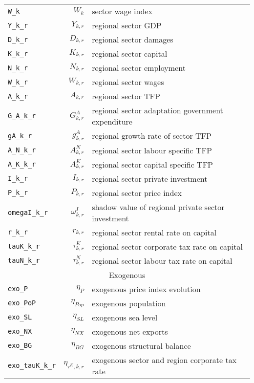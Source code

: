 \begin{center}
\begin{longtable}{lrl}
\texttt{W\_k} & ${W_k}$ & sector wage index\\
\texttt{Y\_k\_r} & ${Y_{k,r}}$ & regional sector GDP\\
\texttt{D\_k\_r} & ${D_{k,r}}$ & regional sector damages\\
\texttt{K\_k\_r} & ${K_{k,r}}$ & regional sector capital\\
\texttt{N\_k\_r} & ${N_{k,r}}$ & regional sector employment\\
\texttt{W\_k\_r} & ${W_{k,r}}$ & regional sector wages\\
\texttt{A\_k\_r} & ${A_{k,r}}$ & regional sector TFP\\
\texttt{G\_A\_k\_r} & ${G^{A}_{k,r}}$ & regional sector adaptation government expenditure\\
\texttt{gA\_k\_r} & ${g^{A}_{k,r}}$ & regional growth rate of sector TFP\\
\texttt{A\_N\_k\_r} & ${A^{N}_{k,r}}$ & regional sector labour specific TFP\\
\texttt{A\_K\_k\_r} & ${A^{K}_{k,r}}$ & regional sector capital specific TFP\\
\texttt{I\_k\_r} & ${I_{k,r}}$ & regional sector private investment\\
\texttt{P\_k\_r} & ${P_{k,r}}$ & regional sector price index\\
\texttt{omegaI\_k\_r} & ${\omega^I_{k,r}}$ & shadow value of regional private sector investment\\
\texttt{r\_k\_r} & ${r_{k,r}}$ & regional sector rental rate on capital\\
\texttt{tauK\_k\_r} & ${\tau^{K}_{k,r}}$ & regional sector corporate tax rate on capital\\
\texttt{tauN\_k\_r} & ${\tau^{N}_{k,r}}$ & regional sector labour tax rate on capital\\
\hline
\multicolumn{3}{c}{Exogenous}\\%
\hline
\texttt{exo\_P} & ${\eta_{P}}$ & exogenous price index evolution\\
\texttt{exo\_PoP} & ${\eta_{Pop}}$ & exogenous population\\
\texttt{exo\_SL} & ${\eta_{SL}}$ & exogenous sea level\\
\texttt{exo\_NX} & ${\eta_{NX}}$ & exogenous net exports\\
\texttt{exo\_BG} & ${\eta_{BG}}$ & exogenous structural balance\\
\texttt{exo\_tauK\_k\_r} & ${\eta_{\tau^{K},k,r}}$ & exogenous sector and region corporate tax rate\\

\end{longtable}
\end{center}
